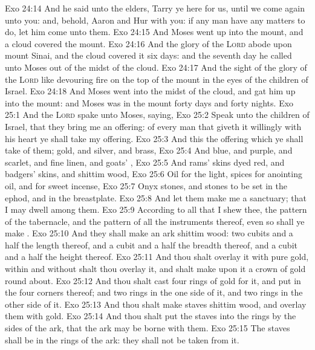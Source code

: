 \vs Exo 24:14 And he said unto the elders, Tarry ye here for us, until we come again unto you: and, behold, Aaron and Hur  with you: if any man have any matters to do, let him come unto them.
\vs Exo 24:15 And Moses went up into the mount, and a cloud covered the mount.
\vs Exo 24:16 And the glory of the \textsc{Lord} abode upon mount Sinai, and the cloud covered it six days: and the seventh day he called unto Moses out of the midst of the cloud.
\vs Exo 24:17 And the sight of the glory of the \textsc{Lord}  like devouring fire on the top of the mount in the eyes of the children of Israel.
\vs Exo 24:18 And Moses went into the midst of the cloud, and gat him up into the mount: and Moses was in the mount forty days and forty nights.
\vs Exo 25:1 And the \textsc{Lord} spake unto Moses, saying,
\vs Exo 25:2 Speak unto the children of Israel, that they bring me an offering: of every man that giveth it willingly with his heart ye shall take my offering.
\vs Exo 25:3 And this  the offering which ye shall take of them; gold, and silver, and brass,
\vs Exo 25:4 And blue, and purple, and scarlet, and fine linen, and goats' ,
\vs Exo 25:5 And rams' skins dyed red, and badgers' skins, and shittim wood,
\vs Exo 25:6 Oil for the light, spices for anointing oil, and for sweet incense,
\vs Exo 25:7 Onyx stones, and stones to be set in the ephod, and in the breastplate.
\vs Exo 25:8 And let them make me a sanctuary; that I may dwell among them.
\vs Exo 25:9 According to all that I shew thee,  the pattern of the tabernacle, and the pattern of all the instruments thereof, even so shall ye make .
\vs Exo 25:10 And they shall make an ark  shittim wood: two cubits and a half  the length thereof, and a cubit and a half the breadth thereof, and a cubit and a half the height thereof.
\vs Exo 25:11 And thou shalt overlay it with pure gold, within and without shalt thou overlay it, and shalt make upon it a crown of gold round about.
\vs Exo 25:12 And thou shalt cast four rings of gold for it, and put  in the four corners thereof; and two rings  in the one side of it, and two rings in the other side of it.
\vs Exo 25:13 And thou shalt make staves  shittim wood, and overlay them with gold.
\vs Exo 25:14 And thou shalt put the staves into the rings by the sides of the ark, that the ark may be borne with them.
\vs Exo 25:15 The staves shall be in the rings of the ark: they shall not be taken from it.
